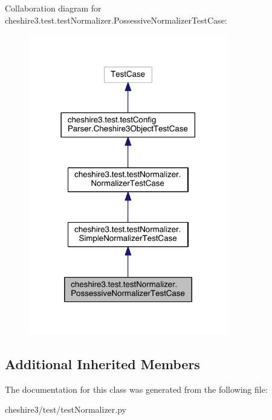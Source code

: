 Collaboration diagram for cheshire3.\-test.\-test\-Normalizer.\-Possessive\-Normalizer\-Test\-Case\-:
\nopagebreak
\begin{figure}[H]
\begin{center}
\leavevmode
\includegraphics[width=246pt]{classcheshire3_1_1test_1_1test_normalizer_1_1_possessive_normalizer_test_case__coll__graph}
\end{center}
\end{figure}
\subsection*{Additional Inherited Members}


The documentation for this class was generated from the following file\-:\begin{DoxyCompactItemize}
\item 
cheshire3/test/test\-Normalizer.\-py\end{DoxyCompactItemize}

